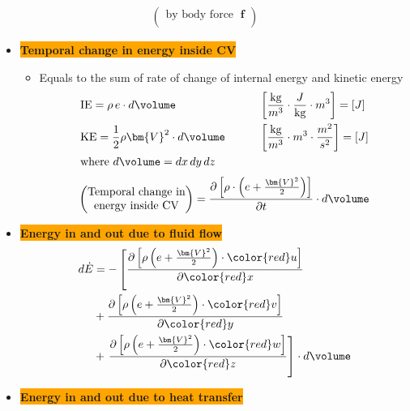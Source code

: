 \begin{itemize}
\begin{align*}
\begin{pmatrix}
            \text{by body force }\;\bm{f} \\
        \end{pmatrix}
    \end{align*}
    \begin{itemize}
        \item \colorbox{orange}{\textbf{\color{white}Temporal change in energy inside CV}}
        \begin{itemize}
            \item Equals to the sum of rate of change of internal energy and kinetic energy
            \begin{alignat*}{2}
                &\text{IE} = \rho \, e \cdot d\volume \qquad && \left[\frac{\text{kg}}{m^3}\cdot \frac{J}{\text{kg}}\cdot m^3\right]=[J] \\
                &\text{KE} = \frac{1}{2}\rho \bm{V}^2 \cdot d\volume \qquad && \left[\frac{\text{kg}}{m^3}\cdot m^3 \cdot \frac{m^2}{s^2}\right]=[J] \\
                & \text{where }d\volume = dx \, dy \,dz
            \end{alignat*}
            \begin{equation*}
                \begin{pmatrix}
                    \text{Temporal change in}\\
                    \text{energy inside CV}
                \end{pmatrix} = \frac{\partial \left[\rho \cdot \left( e + \frac{\bm{V}^2}{2} \right)\right]}{\partial t} \cdot d\volume
            \end{equation*}
        \end{itemize}
        \item \colorbox{orange}{\textbf{\color{white}Energy in and out due to fluid flow}}
        \begin{align*}
            d\dot{E} &= - \left[\frac{\partial \left[\rho\left(e+\frac{\bm{V}^2}{2}\right)\cdot {\color{red}u}\right]}{\partial {\color{red}x}}\right.\\
            &+\frac{\partial \left[\rho\left(e+\frac{\bm{V}^2}{2}\right)\cdot {\color{red}v}\right]}{\partial {\color{red}y}}\\
            &+ \left.\frac{\partial \left[\rho\left(e+\frac{\bm{V}^2}{2}\right)\cdot {\color{red}w}\right]}{\partial {\color{red}z}}\right]\cdot d\volume
        \end{align*}
        \item \colorbox{orange}{\textbf{\color{white}Energy in and out due to heat transfer}}

\end{itemize}
\end{itemize}

